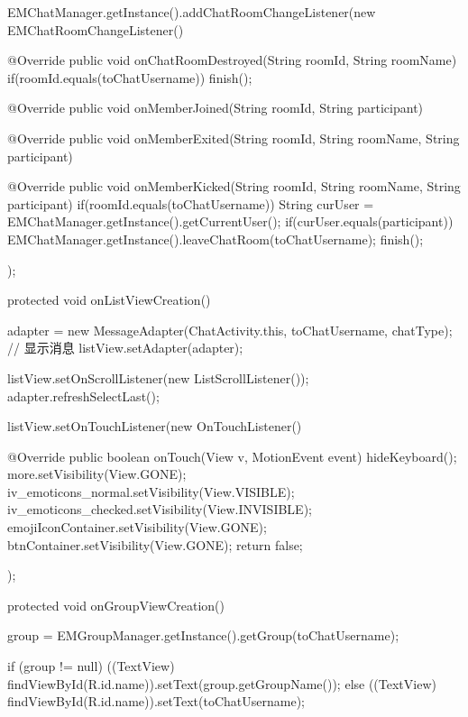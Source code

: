 {{        EMChatManager.getInstance().addChatRoomChangeListener(new EMChatRoomChangeListener(){

            @Override
            public void onChatRoomDestroyed(String roomId, String roomName) {
                if(roomId.equals(toChatUsername)){
                    finish();
                }
            }

            @Override
            public void onMemberJoined(String roomId, String participant) {                
            }

            @Override
            public void onMemberExited(String roomId, String roomName,
                    String participant) {
                
            }

            @Override
            public void onMemberKicked(String roomId, String roomName,
                    String participant) {
                if(roomId.equals(toChatUsername)){
                    String curUser = EMChatManager.getInstance().getCurrentUser();
                    if(curUser.equals(participant)){
                        EMChatManager.getInstance().leaveChatRoom(toChatUsername);
                        finish();
                    }
                }
            }
            
        });
	}
	
	protected void onListViewCreation(){
        adapter = new MessageAdapter(ChatActivity.this, toChatUsername, chatType);
        // 显示消息
        listView.setAdapter(adapter);
        
        listView.setOnScrollListener(new ListScrollListener());
        adapter.refreshSelectLast();

        listView.setOnTouchListener(new OnTouchListener() {

            @Override
            public boolean onTouch(View v, MotionEvent event) {
                hideKeyboard();
                more.setVisibility(View.GONE);
                iv_emoticons_normal.setVisibility(View.VISIBLE);
                iv_emoticons_checked.setVisibility(View.INVISIBLE);
                emojiIconContainer.setVisibility(View.GONE);
                btnContainer.setVisibility(View.GONE);
                return false;
            }
        });
	}
	
	protected void onGroupViewCreation(){
	    group = EMGroupManager.getInstance().getGroup(toChatUsername);
        
        if (group != null){
            ((TextView) findViewById(R.id.name)).setText(group.getGroupName());
        }else{
            ((TextView) findViewById(R.id.name)).setText(toChatUsername);
        }
        
}}
